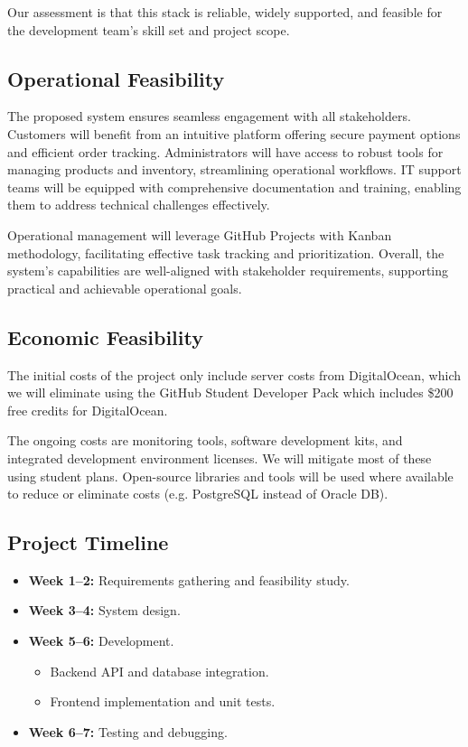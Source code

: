 \documentclass[a4paper,journal]{IEEEtran}
\begin{document}
Our assessment is that this stack is reliable, widely supported, and feasible
for the development team's skill set and project scope.

\subsection{Operational Feasibility}
The proposed system ensures seamless engagement with all stakeholders.
Customers will benefit from an intuitive platform offering secure payment
options and efficient order tracking.
Administrators will have access to robust tools for managing products and
inventory, streamlining operational workflows.
IT support teams will be equipped with comprehensive documentation and training,
enabling them to address technical challenges effectively.

Operational management will leverage GitHub Projects with Kanban methodology,
facilitating effective task tracking and prioritization. Overall, the system's
capabilities are well-aligned with stakeholder requirements, supporting
practical and achievable operational goals.

\subsection{Economic Feasibility}
The initial costs of the project only include server costs from DigitalOcean,
which we will eliminate using the GitHub Student Developer Pack which includes
\$200 free credits for DigitalOcean.

The ongoing costs are monitoring tools, software development kits, and
integrated development environment licenses.
We will mitigate most of these using student plans.
Open-source libraries and tools will be used where available to reduce or
eliminate costs (e.g. PostgreSQL instead of Oracle DB).

\subsection{Project Timeline}
\begin{itemize}
  \item \textbf{Week 1--2:} Requirements gathering and feasibility study.
  \item \textbf{Week 3--4:} System design.
  \item \textbf{Week 5--6:} Development.
    \begin{itemize}
      \item Backend API and database integration.
      \item Frontend implementation and unit tests.
    \end{itemize}
  \item \textbf{Week 6--7:} Testing and debugging.
\end{itemize}
\end{document}
